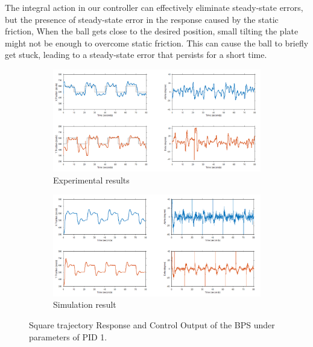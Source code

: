 The integral action in our controller can effectively eliminate steady-state errors, but the presence of steady-state error in the response caused by the static friction, When the ball gets close to the desired position, small tilting the plate might not be enough to overcome static friction. This can cause the ball to briefly get stuck, leading to a steady-state error that persists for a short time.
\begin{figure}[h]
     \centering
     \begin{subfigure}[b]{1\textwidth}
         \centering
         \includegraphics[width=\textwidth]{Figures/chapter05/square_tracking_PID1_Expiremental.png}
         \caption{Experimental results}
         \label{fig:y equals x}
     \end{subfigure}
     \hfill
     \begin{subfigure}[b]{1\textwidth}
         \centering
         \includegraphics[width=\textwidth]{Figures/chapter05/square_tracking_PID1_simulation.png}
         \caption{Simulation result}
         \label{fig:three sin x}
     \end{subfigure}
        \caption{Square trajectory Response and Control Output of the  BPS under parameters of PID 1.}
        \label{fig:three graphs}
\end{figure}
